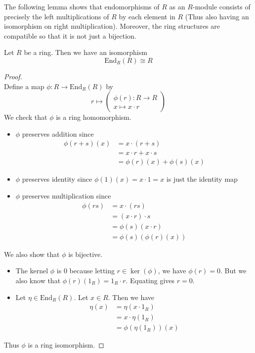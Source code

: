 \documentclass[a4paper]{article}
\begin{document}
The following lemma shows that endomorphisms of $R$ as an $R$-module consists of precisely the left multiplications of $R$ by each element in $R$ (Thus also having an isomorphism on right multiplication). Moreover, the ring structures are compatible so that it is not just a bijection. 

\begin{prp}{}{} Let $R$ be a ring. Then we have an isomorphism $$\text{End}_R(R)\cong R$$ 
\begin{proof}~\\
Define a map $\phi:R\to\text{End}_R(R)$ by $$r\mapsto\begin{pmatrix}
\phi(r):R\to R\\x\mapsto x\cdot r
\end{pmatrix}$$ We check that $\phi$ is a ring homomorphism. 
\begin{itemize}
\item $\phi$ preserves addition since 
\begin{align*}
\phi(r+s)(x)&=x\cdot (r+s)\\
&=x\cdot r+x\cdot s\\
&=\phi(r)(x)+\phi(s)(x)
\end{align*}
\item $\phi$ preserves identity since $\phi(1)(x)=x\cdot 1=x$ is just the identity map
\item $\phi$ preserves multiplication since 
\begin{align*}
\phi(rs)&=x\cdot (rs)\\
&=(x\cdot r)\cdot s\\
&=\phi(s)(x\cdot r)\\
&=\phi(s)(\phi(r)(x))
\end{align*}
\end{itemize}
We also show that $\phi$ is bijective. 
\begin{itemize}
\item The kernel $\phi$ is $0$ because letting $r\in\ker(\phi)$, we have $\phi(r)=0$. But we also know that $\phi(r)(1_R)=1_R\cdot r$. Equating gives $r=0$. 
\item Let $\eta\in\text{End}_R(R)$. Let $x\in R$. Then we have 
\begin{align*}
\eta(x)&=\eta(x\cdot 1_R)\\
&=x\cdot\eta(1_R)\tag{$\eta$ is a module homomorphism}\\
&=\phi(\eta(1_R))(x)
\end{align*}
\end{itemize}
Thus $\phi$ is a ring isomorphism. 
\end{proof}
\end{prp}
\end{document}
